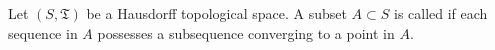 Let $(S, \mathfrak{T})$ be a Hausdorff topological space. A subset $A \subset S$ is called  if each sequence in $A$ possesses a subsequence converging to a point in $A$.
